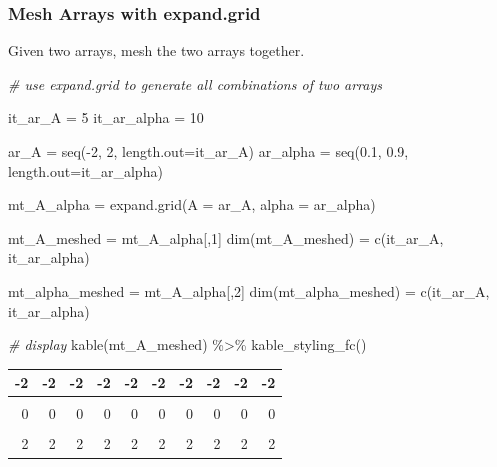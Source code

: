 \documentclass[
]{book}
\newenvironment{Shaded}{\begin{snugshade}}{\end{snugshade}}
\newcommand{\AttributeTok}[1]{\textcolor[rgb]{0.77,0.63,0.00}{#1}}
\newcommand{\CommentTok}[1]{\textcolor[rgb]{0.56,0.35,0.01}{\textit{#1}}}
\newcommand{\DecValTok}[1]{\textcolor[rgb]{0.00,0.00,0.81}{#1}}
\newcommand{\FloatTok}[1]{\textcolor[rgb]{0.00,0.00,0.81}{#1}}
\newcommand{\FunctionTok}[1]{\textcolor[rgb]{0.00,0.00,0.00}{#1}}
\newcommand{\NormalTok}[1]{#1}
\newcommand{\OtherTok}[1]{\textcolor[rgb]{0.56,0.35,0.01}{#1}}
\newcommand{\SpecialCharTok}[1]{\textcolor[rgb]{0.00,0.00,0.00}{#1}}
\begin{document}
\hypertarget{mesh-arrays-with-expand.grid}{%
\subsubsection{Mesh Arrays with expand.grid}\label{mesh-arrays-with-expand.grid}}

Given two arrays, mesh the two arrays together.

\begin{Shaded}
\begin{Highlighting}[]
\CommentTok{\# use expand.grid to generate all combinations of two arrays}

\NormalTok{it\_ar\_A }\OtherTok{=} \DecValTok{5}
\NormalTok{it\_ar\_alpha }\OtherTok{=} \DecValTok{10}

\NormalTok{ar\_A }\OtherTok{=} \FunctionTok{seq}\NormalTok{(}\SpecialCharTok{{-}}\DecValTok{2}\NormalTok{, }\DecValTok{2}\NormalTok{, }\AttributeTok{length.out=}\NormalTok{it\_ar\_A)}
\NormalTok{ar\_alpha }\OtherTok{=} \FunctionTok{seq}\NormalTok{(}\FloatTok{0.1}\NormalTok{, }\FloatTok{0.9}\NormalTok{, }\AttributeTok{length.out=}\NormalTok{it\_ar\_alpha)}

\NormalTok{mt\_A\_alpha }\OtherTok{=} \FunctionTok{expand.grid}\NormalTok{(}\AttributeTok{A =}\NormalTok{ ar\_A, }\AttributeTok{alpha =}\NormalTok{ ar\_alpha)}

\NormalTok{mt\_A\_meshed }\OtherTok{=}\NormalTok{ mt\_A\_alpha[,}\DecValTok{1}\NormalTok{]}
\FunctionTok{dim}\NormalTok{(mt\_A\_meshed) }\OtherTok{=} \FunctionTok{c}\NormalTok{(it\_ar\_A, it\_ar\_alpha)}

\NormalTok{mt\_alpha\_meshed }\OtherTok{=}\NormalTok{ mt\_A\_alpha[,}\DecValTok{2}\NormalTok{]}
\FunctionTok{dim}\NormalTok{(mt\_alpha\_meshed) }\OtherTok{=} \FunctionTok{c}\NormalTok{(it\_ar\_A, it\_ar\_alpha)}

\CommentTok{\# display}
\FunctionTok{kable}\NormalTok{(mt\_A\_meshed) }\SpecialCharTok{\%\textgreater{}\%}
  \FunctionTok{kable\_styling\_fc}\NormalTok{()}
\end{Highlighting}
\end{Shaded}

\begin{table}[!h]
\centering
\begin{tabular}{r|r|r|r|r|r|r|r|r|r}
\hline
-2 & -2 & -2 & -2 & -2 & -2 & -2 & -2 & -2 & -2\\
\hline
\cellcolor{gray!6}{-1} & \cellcolor{gray!6}{-1} & \cellcolor{gray!6}{-1} & \cellcolor{gray!6}{-1} & \cellcolor{gray!6}{-1} & \cellcolor{gray!6}{-1} & \cellcolor{gray!6}{-1} & \cellcolor{gray!6}{-1} & \cellcolor{gray!6}{-1} & \cellcolor{gray!6}{-1}\\
\hline
0 & 0 & 0 & 0 & 0 & 0 & 0 & 0 & 0 & 0\\
\hline
\cellcolor{gray!6}{1} & \cellcolor{gray!6}{1} & \cellcolor{gray!6}{1} & \cellcolor{gray!6}{1} & \cellcolor{gray!6}{1} & \cellcolor{gray!6}{1} & \cellcolor{gray!6}{1} & \cellcolor{gray!6}{1} & \cellcolor{gray!6}{1} & \cellcolor{gray!6}{1}\\
\hline
2 & 2 & 2 & 2 & 2 & 2 & 2 & 2 & 2 & 2\\
\hline
\end{tabular}
\end{table}
\end{document}
